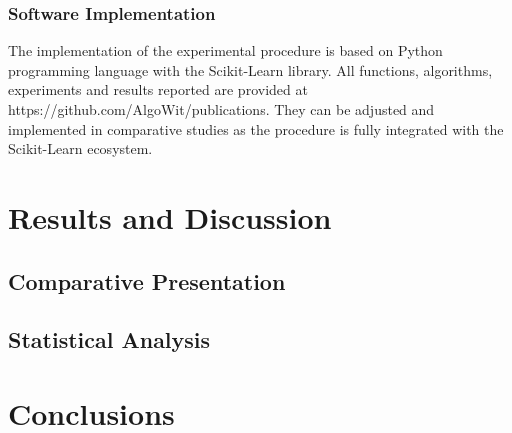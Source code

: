 \documentclass[parskip=full]{scrartcl}
\begin{document}
\subsubsection{Software Implementation}

The implementation of the experimental procedure is based on Python programming language with the Scikit-Learn \cite{PedregosaF.VaroquauxG.GramfortA.MichelV.ThirionB.GriselO.BlondelM.Prette.2011} library. All functions, algorithms, experiments and results reported are provided at https://github.com/AlgoWit/publications. They can be adjusted and implemented in comparative studies as the procedure is fully integrated with the Scikit-Learn ecosystem.    

\section{Results and Discussion}
\subsection{Comparative Presentation}
\subsection{Statistical Analysis}

\section{Conclusions}



\end{document}
